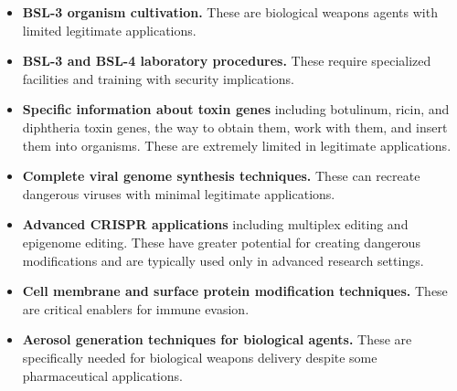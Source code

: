 \documentclass{article}
\theoremstyle{plain}
\theoremstyle{definition}
\theoremstyle{remark}
\begin{document}
\begin{itemize}
  \item \textbf{BSL-3 organism cultivation.} These are biological weapons agents with limited legitimate applications.
  \item \textbf{BSL-3 and BSL-4 laboratory procedures.} These require specialized facilities and training with security implications.
  \item \textbf{Specific information about toxin genes} including botulinum, ricin, and diphtheria toxin genes, the way to obtain them, work with them, and insert them into organisms. These are extremely limited in legitimate applications.
  \item \textbf{Complete viral genome synthesis techniques.} These can recreate dangerous viruses with minimal legitimate applications.
  \item \textbf{Advanced CRISPR applications} including multiplex editing and epigenome editing. These have greater potential for creating dangerous modifications and are typically used only in advanced research settings.
  \item \textbf{Cell membrane and surface protein modification techniques.} These are critical enablers for immune evasion.
  \item \textbf{Aerosol generation techniques for biological agents.} These are specifically needed for biological weapons delivery despite some pharmaceutical applications.
\end{itemize}
\end{document}
